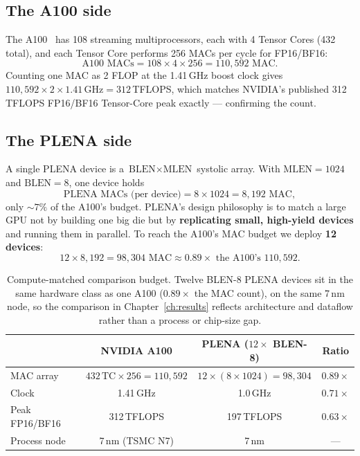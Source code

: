 \documentclass[11pt]{report}
\begin{document}
\subsection{The A100 side}

The A100~\cite{nvidia2020a100} has 108 streaming multiprocessors, each with
4 Tensor Cores (432 total), and each Tensor Core performs 256 MACs per cycle
for FP16/BF16:
\[
\text{A100 MACs} = 108 \times 4 \times 256 = 110{,}592 \text{ MAC}.
\]
Counting one MAC as 2 FLOP at the 1.41\,GHz boost clock gives
$110{,}592 \times 2 \times 1.41\,\text{GHz} = 312$\,TFLOPS, which matches
NVIDIA's published 312\,TFLOPS FP16/BF16 Tensor-Core peak exactly ---
confirming the count.

\subsection{The PLENA side}

A single PLENA device is a $\text{BLEN}\times\text{MLEN}$ systolic array.
With $\text{MLEN}=1024$ and $\text{BLEN}=8$, one device holds
\[
\text{PLENA MACs (per device)} = 8 \times 1024 = 8{,}192 \text{ MAC},
\]
only ${\sim}7\%$ of the A100's budget. PLENA's design philosophy is to
match a large GPU not by building one big die but by \textbf{replicating
small, high-yield devices} and running them in parallel. To reach the
A100's MAC budget we deploy \textbf{12 devices}:
\[
12 \times 8{,}192 = 98{,}304 \text{ MAC} \approx 0.89\times \text{ the A100's } 110{,}592.
\]

\begin{table}[t]
\centering
\caption{Compute-matched comparison budget. Twelve BLEN-8 PLENA devices sit
in the same hardware class as one A100 ($0.89\times$ the MAC count), on the
same 7\,nm node, so the comparison in Chapter~\ref{ch:results} reflects
architecture and dataflow rather than a process or chip-size gap.}
\label{tab:a100-match}
\begin{tabular}{@{}lccc@{}}
\toprule
 & NVIDIA A100 & PLENA ($12\times$ BLEN-8) & Ratio \\
\midrule
MAC array & $432\,\text{TC}\times256 = 110{,}592$ & $12\times(8{\times}1024)=98{,}304$ & $0.89\times$ \\
Clock & 1.41\,GHz & 1.0\,GHz & $0.71\times$ \\
Peak FP16/BF16 & 312\,TFLOPS & 197\,TFLOPS & $0.63\times$ \\
Process node & 7\,nm (TSMC N7) & 7\,nm & --- \\
\bottomrule
\end{tabular}
\end{table}
\end{document}
